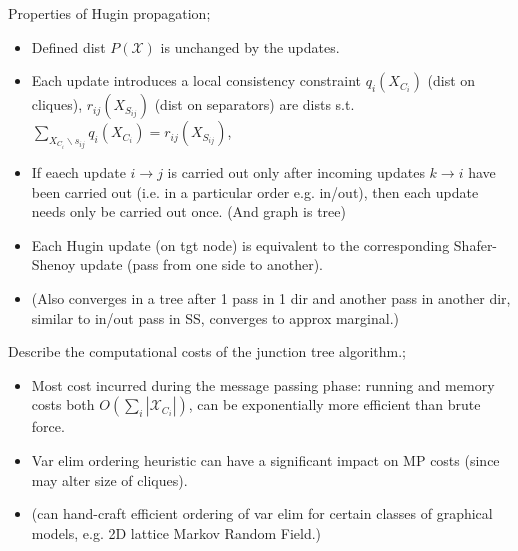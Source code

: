 \documentclass{article}
\begin{document}
Properties of Hugin propagation; \begin{itemize} \item Defined dist $P(\mathcal{X})$ is unchanged by the updates.  \item Each update introduces a local consistency constraint $q_i(X_{C_i})$ (dist on cliques), $r_{ij}(X_{S_{ij}})$ (dist on separators) are dists s.t. $\sum_{X_{C_i}\backslash s_{ij}}q_i(X_{C_i})=r_{ij}(X_{S_{ij}})$, \item If eaech update $i\rightarrow j$ is carried out only after incoming updates $k\rightarrow i$ have been carried out (i.e. in a particular order e.g. in/out), then each update needs only be carried out once. (And graph is tree) \item Each Hugin update (on tgt node) is equivalent to the corresponding Shafer-Shenoy update (pass from one side to another).  \item (Also converges in a tree after 1 pass in 1 dir and another pass in another dir, similar to in/out pass in SS, converges to approx marginal.) \end{itemize}

Describe the computational costs of the junction tree algorithm.; \begin{itemize} \item Most cost incurred during the message passing phase: running and memory costs both $O(\sum_i|\mathcal{X}_{C_i}|)$, can be exponentially more efficient than brute force.  \item Var elim ordering heuristic can have a significant impact on MP costs (since may alter size of cliques).  \item (can hand-craft efficient ordering of var elim for certain classes of graphical models, e.g. 2D lattice Markov Random Field.) \end{itemize}
\end{document}
